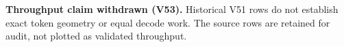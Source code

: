 \begin{minipage}{0.82\linewidth}
\small\textbf{Throughput claim withdrawn (V53).} Historical V51 rows do not establish exact token geometry or equal decode work. The source rows are retained for audit, not plotted as validated throughput.
\end{minipage}
